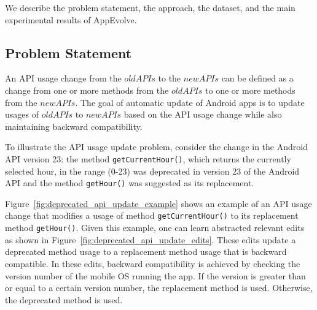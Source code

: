 We describe the problem statement, the approach, the dataset, and the main experimental results of AppEvolve.

\subsection{Problem Statement}\label{sec:problem}

An API usage change from the $oldAPIs$ to the $newAPIs$ can be defined as a change from one or more methods from the $oldAPIs$ to one or more methods from the $newAPIs$. The goal of automatic update of Android apps is to update usages of $oldAPIs$ to $newAPIs$ based on the API usage change while also maintaining backward compatibility.


To illustrate the API usage update problem, consider the change in the Android API version 23: the method \texttt{getCurrentHour()}, which returns the currently selected hour, in the range (0-23) was deprecated in version 23 of the Android API and the method \texttt{getHour()} was suggested as its replacement. 

Figure~\ref{fig:deprecated_api_update_example} shows an example of an API usage change that modifies a usage of method \texttt{getCurrentHour()} to its replacement method \texttt{getHour()}. Given this example, one can learn abstracted relevant edits as shown in Figure~\ref{fig:deprecated_api_update_edits}. These edits update a deprecated method usage to a replacement method usage that is backward compatible. In these edits, backward compatibility is achieved by checking the version number of the mobile OS running the app. If the version is greater than or equal to a certain version number, the replacement method is used. Otherwise, the deprecated method is used.

